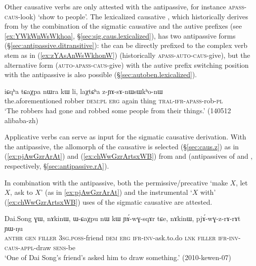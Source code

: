 Other causative verbs are only attested with the  antipassive, for instance   \textsc{apass}-\textsc{caus}-look) `show to people'. The lexicalized causative  , which historically derives from  by the combination of the sigmatic causative  and the autive  prefixes (see \ref{ex:YWkWnWsWkhoa}, §\ref{sec:sig.caus.lexicalized}), has two  antipassive forms (§\ref{sec:antipassive.ditransitive}): the  can be directly prefixed to the complex verb stem as in  (\ref{ex:zYAsAnWsWkhonW}) (historically  \textsc{apass}-\textsc{auto}-\textsc{caus}-give), but the alternative form  (\textsc{auto}-\textsc{apass}-\textsc{caus}-give) with the autive prefix  switching position with the antipassive is also possible  (§\ref{sec:autoben.lexicalized}).
 
\begin{exe}
\ex  \label{ex:zYAsAnWsWkhonW}
\gll   iɕqʰa tɕaχpa nɯra kɯ li, laχtɕʰa z-ɲɤ-sɤ-nɯsɯkʰo-nɯ  \\
the.aforementioned robber \textsc{dem}:\textsc{pl} \textsc{erg} again thing \textsc{tral}-\textsc{ifr}-\textsc{apass}-rob-\textsc{pl}   \\
\glt `The robbers had gone and robbed some people from their things.' (140512 alibaba-zh) 
\end{exe}  

Applicative verbs can serve as input for the sigmatic causative derivation. With the  antipassive, the  allomorph of the causative is selected (§\ref{sec:caus.z}) as in   (\ref{ex:pjAwGzrArAt}) and  (\ref{ex:chWwGzrArtsxWB})  from  and  (antipassives of  and , respectively, §\ref{sec:antipassive.rA}). 

In combination with the antipassive, both the permissive/precative `make $X$, let $X$, ask to $X$' (as in \ref{ex:pjAwGzrArAt}) and the instrumental `$X$ with' (\ref{ex:chWwGzrArtsxWB}) uses of the sigmatic causative are attested.
\newpage
\begin{exe}
\ex  \label{ex:pjAwGzrArAt}
\gll  Dai.Song ɣɯ, nɤkinɯ, ɯ-ɕaχpu nɯ kɯ ɲɤ́-wɣ-sqɤr tɕe, nɤkinɯ, pjɤ́-wɣ-z-rɤ-rɤt ɲɯ-ŋu \\
\textsc{anthr} \textsc{gen} \textsc{filler} \textsc{3sg}.\textsc{poss}-friend \textsc{dem} \textsc{erg} \textsc{ifr}-\textsc{inv}-ask.to.do \textsc{lnk} \textsc{filler} \textsc{ifr}-\textsc{inv}-\textsc{caus}-\textsc{appl}-draw \textsc{sens}-be \\
\glt `One of Dai Song's friend's asked him to draw something.' (2010-kewen-07)
\end{exe}  
 
